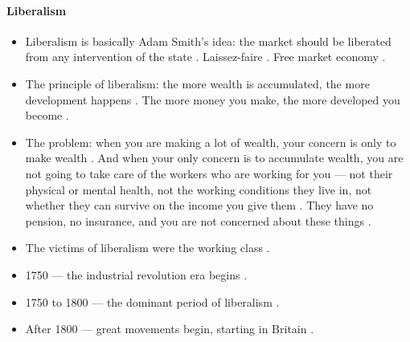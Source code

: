 \paragraph{Liberalism}
\begin{itemize}
    \item Liberalism is basically Adam Smith's idea: the market should be liberated from any intervention of the state . Laissez-faire . Free market economy .
    \item The principle of liberalism: the more wealth is accumulated, the more development happens . The more money you make, the more developed you become .
    \item The problem: when you are making a lot of wealth, your concern is only to make wealth . And when your only concern is to accumulate wealth, you are not going to take care of the workers who are working for you --- not their physical or mental health, not the working conditions they live in, not whether they can survive on the income you give them . They have no pension, no insurance, and you are not concerned about these things .
    \item The victims of liberalism were the working class .
\end{itemize}

\begin{DataFact}
\begin{itemize}
    \item 1750 --- the industrial revolution era begins .
    \item 1750 to 1800 --- the dominant period of liberalism .
    \item After 1800 --- great movements begin, starting in Britain .
\end{itemize}
\end{DataFact}


